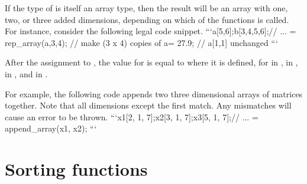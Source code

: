 \begin{description}
\begin{description}
\begin{description}
\begin{description}
\begin{description}
\begin{description}
\begin{description}
\begin{description}
\begin{description}
\begin{description}
\begin{description}
\begin{description}
\begin{description}
\begin{description}
\begin{description}
\begin{description}
\begin{description}
\begin{description}
\begin{description}
\begin{description}
\begin{description}
\begin{description}
\begin{description}
\begin{description}
\begin{description}
\begin{description}
\begin{description}
\begin{description}
\begin{description}
\begin{description}
\begin{description}
If the type  of  is itself an array type, then the result will be an array with one, two, or three added dimensions, depending on which of the  functions is called.  For instance, consider the following legal code snippet.
```\nreal a[5,6];\nreal b[3,4,5,6];\n// ... \nb = rep_array(a,3,4); //  make (3 x 4) copies of a\nb[1,1,1,1] = 27.9;    //  a[1,1] unchanged \n```

After the assignment to , the value for  is equal to  where it is defined, for  in ,  in ,  in , and  in . %

\begin{description}  \end{description}

For example, the following code appends two three dimensional arrays of matrices together. Note that all dimensions except the first match. Any mismatches will cause an error to be thrown.
```\nmatrix[4, 6] x1[2, 1, 7];\nmatrix[4, 6] x2[3, 1, 7];\nmatrix[4, 6] x3[5, 1, 7];\n// ...  = append_array(x1, x2); \n```


\section{Sorting functions}


\end{description}
\end{description}
\end{description}
\end{description}
\end{description}
\end{description}
\end{description}
\end{description}
\end{description}
\end{description}
\end{description}
\end{description}
\end{description}
\end{description}
\end{description}
\end{description}
\end{description}
\end{description}
\end{description}
\end{description}
\end{description}
\end{description}
\end{description}
\end{description}
\end{description}
\end{description}
\end{description}
\end{description}
\end{description}
\end{description}
\end{description}
